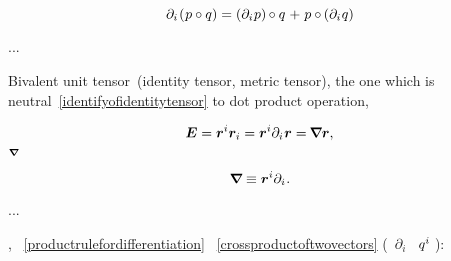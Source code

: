 \begin{otherlanguage}{russian}
\nopagebreak\vspace{-0.4em}\begin{equation}\label{productrulefordifferentiation}
\partial_i \hspace{-0.2ex} \left( \hspace{.1ex} p \circ q \right)
= \left( \partial_i \hspace{.1ex} p \right) \hspace{-0.12ex} \circ q \hspace{.16ex} +
\hspace{.16ex} p \circ \hspace{-0.12ex} \left( \partial_i \hspace{.1ex} q \right)
\end{equation}

...

Bivalent unit tensor~(identity tensor,  metric tensor), the one which is neutral~\eqref{identifyofidentitytensor} to dot product operation,

\nopagebreak\vspace{-0.1em}\begin{equation}
\bm{E} = \bm{r}^i \bm{r}_i = \tikzmark{beginOriginOfNabla} \bm{r}^i \partial_i \tikzmark{endOriginOfNabla} \hspace{.1ex} \bm{r} = \hspace{-0.16ex} \boldnabla \bm{r} ,
\end{equation}
%
{${\scriptstyle \bm{\nabla}\hspace{-0.2ex}}$}

\vspace{-0.4em} \noindent {} 

\nopagebreak\vspace{-0.1em}\begin{equation}
\bm{\nabla}\hspace{-0.2ex} \equiv \bm{r}^i \partial_i \hspace{.1ex} .
\end{equation}

...

,
 ~\eqref{productrulefordifferentiation}
~\eqref{crossproductoftwovectors} 
(~$\partial_i$ ~$q^i\hspace{-0.1ex}$ ):


\end{otherlanguage}
